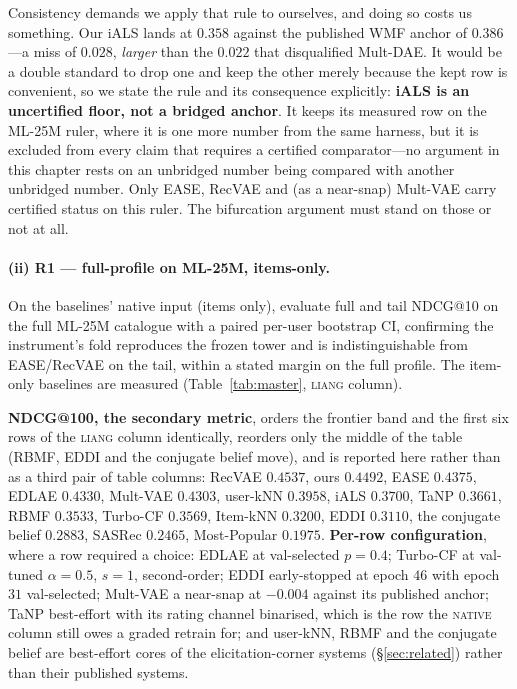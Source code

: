\documentclass[11pt]{article}
\begin{document}
Consistency demands we apply that rule to ourselves, and doing so costs us something. Our iALS lands at $0.358$
against the published WMF anchor of $0.386$---a miss of $0.028$, \emph{larger} than the $0.022$ that disqualified
Mult-DAE. It would be a double standard to drop one and keep the other merely because the kept row is convenient, so
we state the rule and its consequence explicitly: \textbf{iALS is an uncertified floor, not a bridged anchor}. It
keeps its measured row on the ML-25M ruler, where it is one more number from the same harness, but it is excluded
from every claim that requires a certified comparator---no argument in this chapter rests on an unbridged number
being compared with another unbridged number. Only EASE, RecVAE and (as a near-snap) Mult-VAE carry certified
status on this ruler. The
bifurcation argument must stand on those or not at all.

\paragraph{(ii) R1 --- full-profile on ML-25M, items-only.}
On the baselines' native input (items only), evaluate full and tail NDCG@10 on the full ML-25M catalogue with a
paired per-user bootstrap CI, confirming the instrument's fold reproduces the frozen tower and is indistinguishable
from EASE/RecVAE on the tail, within a stated margin on the full profile. The item-only baselines are measured (Table~\ref{tab:master}, \textsc{liang} column).

\textbf{NDCG@100, the secondary metric}, orders the frontier band and the first six rows of the \textsc{liang} column identically, reorders only the middle of the table (RBMF, EDDI and the conjugate belief move), and is reported here
rather than as a third pair of table columns: RecVAE $0.4537$, ours $0.4492$, EASE $0.4375$, EDLAE
$0.4330$, Mult-VAE $0.4303$, user-kNN $0.3958$, iALS $0.3700$, TaNP $0.3661$, RBMF $0.3533$, Turbo-CF
$0.3569$, Item-kNN $0.3200$, EDDI $0.3110$, the conjugate belief $0.2883$, SASRec $0.2465$, Most-Popular
$0.1975$. \textbf{Per-row configuration}, where a row required a choice: EDLAE at val-selected $p{=}0.4$;
Turbo-CF at val-tuned $\alpha{=}0.5$, $s{=}1$, second-order; EDDI early-stopped at epoch $46$ with epoch
$31$ val-selected; Mult-VAE a near-snap at $-0.004$ against its published anchor; TaNP best-effort with its
rating channel binarised, which is the row the \textsc{native} column still owes a graded retrain for; and
user-kNN, RBMF and the conjugate belief are best-effort cores of the elicitation-corner systems
(\S\ref{sec:related}) rather than their published systems.
\end{document}
